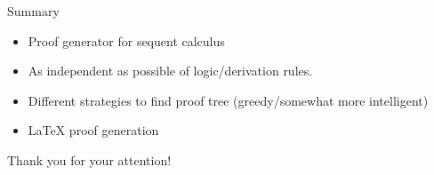 \documentclass{beamer}
\begin{document}
\begin{frame}{Summary}
	\begin{itemize}
		\item Proof generator for sequent calculus
		\item As independent as possible of logic/derivation rules.
		\item Different strategies to find proof tree (greedy/somewhat more intelligent)
		\item LaTeX proof generation
	\end{itemize}

\end{frame}

\begin{frame}%
	Thank you for your attention!
\end{frame}
\end{document}
